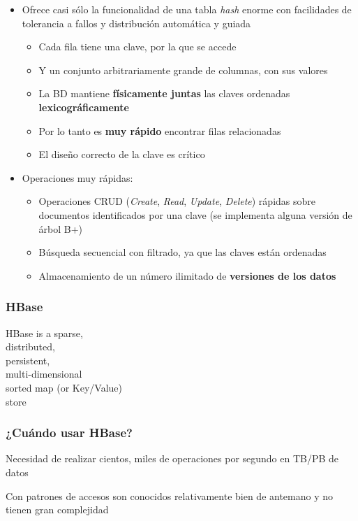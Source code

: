 \documentclass[14pt]{beamer}
\begin{document}
\begin{frame}[allowframebreaks]
\begin{itemize}
\item Ofrece casi sólo la funcionalidad de una tabla {\em hash\/} enorme
  con facilidades de tolerancia a fallos y distribución automática y guiada
  \begin{itemize}
  \item Cada fila tiene una clave, por la que se accede
  \item Y un conjunto arbitrariamente grande de columnas, con sus valores
  \item La BD mantiene {\bf físicamente juntas} las claves ordenadas {\bf
      lexicográficamente}
  \item Por lo tanto es {\bf muy rápido} encontrar filas relacionadas
  \item El diseño correcto de la clave es {\color{red} crítico}
  \end{itemize}

\framebreak

\item Operaciones muy rápidas:
  \begin{itemize}
  \item Operaciones CRUD ({\em Create}, {\em Read}, {\em Update}, {\em
      Delete}) rápidas sobre documentos identificados por una clave (se
    implementa alguna versión de árbol B+)
\item Búsqueda secuencial con filtrado, ya que las claves están ordenadas
\item Almacenamiento de un número ilimitado de {\bf versiones de los datos}
  \end{itemize}
  \end{itemize}
\end{frame}

\begin{frame}
  \frametitle{HBase}
  \begin{block}{}
    {\Large  HBase is a {\color{red} sparse},\\ {\color{green} distributed},\\
      {\color{blue} persistent},\\ {\color{red} multi-dimensional} \\
      {\color{green} sorted map} (or Key/Value) \\ {\color{blue} store}}
  \end{block}
\end{frame}

\begin{frame}
  \frametitle{¿Cuándo usar HBase?}

  \begin{block}{}
    Necesidad de realizar cientos, miles de operaciones por segundo en
    TB/PB de datos
  \end{block}

  \begin{block}{}
    Con patrones de accesos son conocidos relativamente bien de antemano y
    no tienen gran complejidad
  \end{block}

\end{frame}
\end{document}
